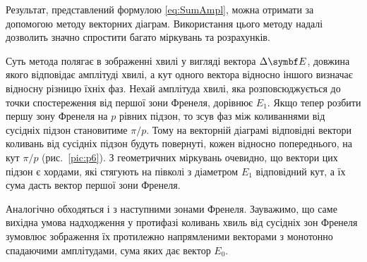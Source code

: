 Результат, представлений формулою \eqref{eq:SumAmpl}, можна отримати за допомогою методу векторних діаграм. Використання цього методу надалі дозволить значно спростити багато міркувань та розрахунків.

Суть метода полягає в зображенні хвилі у вигляді вектора $ \Delta\vect{E} $, довжина якого відповідає амплітуді хвилі, а кут одного вектора відносно іншого визначає відносну різницю їхніх фаз. Нехай амплітуда хвилі, яка розповсюджується до точки спостереження від першої зони Френеля, дорівнює $ E_{1} $. Якщо тепер розбити першу зону Френеля на  $ p $  рівних підзон, то зсув фаз між коливаннями від сусідніх підзон становитиме $ \pi/p $. Тому на векторній діаграмі відповідні вектори коливань від сусідніх підзон будуть повернуті, кожен відносно попереднього, на кут $ \pi/p $ (рис.~\ref{pic:p6}). З геометричних міркувань очевидно, що вектори цих підзон є хордами, які стягують на півколі з діаметром $ E_{1} $ відповідний кут, а їх сума дасть вектор першої зони Френеля.


Аналогічно обходяться і з наступними зонами Френеля. Зауважимо, що саме вихідна умова надходження у протифазі коливань хвиль від сусідніх зон Френеля зумовлює зображення їх протилежно напрямленими векторами з монотонно спадаючими амплітудами, сума яких дає вектор $ E_0 $.

